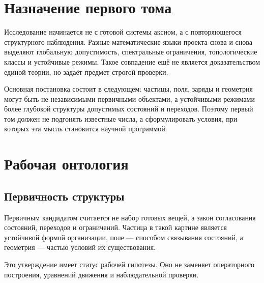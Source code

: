 \begin{abstract}
Первый том не объявляет завершённую физическую теорию. Его задача ---
зафиксировать исходную исследовательскую программу, ввести единый язык
описания и определить, каким требованиям должна удовлетворять будущая
проверяемая модель. Геометрические, спектральные, топологические, фазовые и
корреляционные конструкции рассматриваются как разные способы чтения одного
возможного структурного источника. Том устанавливает границу между рабочей
онтологией, полуформальным каркасом и доказанным физическим результатом.
\end{abstract}

\chapter{Назначение первого тома}

Исследование начинается не с готовой системы аксиом, а с повторяющегося
структурного наблюдения. Разные математические языки проекта снова и снова
выделяют глобальную допустимость, спектральные ограничения, топологические
классы и устойчивые режимы. Такое совпадение ещё не является доказательством
единой теории, но задаёт предмет строгой проверки.

Основная постановка состоит в следующем: частицы, поля, заряды и геометрия
могут быть не независимыми первичными объектами, а устойчивыми режимами более
глубокой структуры допустимых состояний и переходов. Поэтому первый том должен
не подгонять известные числа, а сформулировать условия, при которых эта мысль
становится научной программой.

\chapter{Рабочая онтология}

\section{Первичность структуры}

Первичным кандидатом считается не набор готовых вещей, а закон согласования
состояний, переходов и ограничений. Частица в такой картине является устойчивой
формой организации, поле --- способом связывания состояний, а геометрия ---
частью условий их существования.

Это утверждение имеет статус рабочей гипотезы. Оно не заменяет операторного
построения, уравнений движения и наблюдательной проверки.

